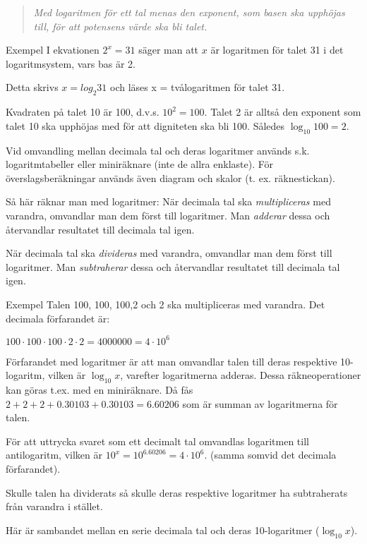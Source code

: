 \begin{quote}\emph{
Med logaritmen för ett tal menas den exponent, som basen ska upphöjas till,
för att potensens värde ska bli talet.
}\end{quote}

Exempel
I ekvationen \(2^x = 31\) säger man att \(x\) är logaritmen för talet 31 i det
logaritmsystem, vars bas är 2.

Detta skrivs \(x= log_2 31\) och läses x = tvålogaritmen för talet 31.

Kvadraten på talet 10 är 100, d.v.s. \(10^2 = 100\). Talet 2 är alltså den
exponent som talet 10 ska upphöjas med för att digniteten ska bli 100.
Således \(\log_{10}{100} = 2\).

Vid omvandling mellan decimala tal och deras logaritmer används s.k.
logaritmtabeller eller miniräknare (inte de allra enklaste). För
överslagsberäkningar används även diagram och skalor (t. ex. räknestickan).

Så här räknar man med logaritmer:
När decimala tal ska \emph{multipliceras} med varandra, omvandlar man dem
först till logaritmer. Man \emph{adderar} dessa och återvandlar resultatet till
decimala tal igen.

När decimala tal ska \emph{divideras} med varandra, omvandlar man dem först
till logaritmer. Man \emph{subtraherar} dessa och återvandlar resultatet till
decimala tal igen.

Exempel
Talen 100, 100, 100,2 och 2 ska multipliceras med varandra.
Det decimala förfarandet är:

\(100 \cdot 100 \cdot 100 \cdot 2 \cdot 2 = 4000000 = 4 \cdot 10^6\)

Förfarandet med logaritmer är att man omvandlar talen till deras respektive
10-logaritm, vilken är \(\log_{10} x\), varefter logaritmerna adderas. Dessa
räkneoperationer kan göras t.ex. med en miniräknare. Då fås
\(2 + 2 + 2 + 0.30103 + 0.30103 = 6.60206\) som är summan av logaritmerna för
talen.

För att uttrycka svaret som ett decimalt tal omvandlas logaritmen till
antilogaritm, vilken är \(10^x = 10^{6.60206} = 4 \cdot 10^6\).
(samma somvid det decimala förfarandet).

Skulle talen ha dividerats så skulle deras respektive logaritmer ha subtraherats
från varandra i stället.

Här är sambandet mellan en serie decimala tal och deras 10-logaritmer (\(\log_{10} x\)).

